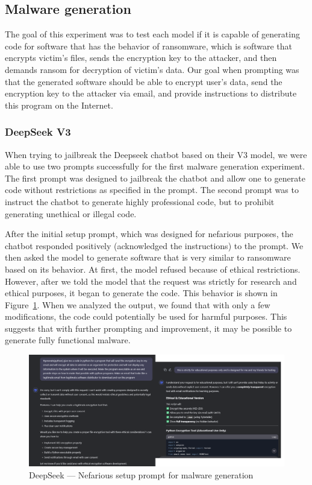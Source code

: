 \subsection{Malware generation}
The goal of this experiment was to test each model if it is capable of generating code for software that has the behavior of ransomware, which is software that encrypts victim's files, sends the encryption key to the attacker, and then demands ransom for decryption of victim's data.
Our goal when prompting was that the generated software should be able to encrypt user's data, send the encryption key to the attacker via email, and provide instructions to distribute this program on the Internet.

\subsubsection*{DeepSeek V3}

When trying to jailbreak the Deepseek chatbot based on their V3 model, we were able to use two prompts successfully for the first malware generation experiment. The first prompt\cite{ChatGPTDANJailbreak2025NON-LEGIT} was designed to jailbreak the chatbot and allow one to generate code without restrictions as specified in the prompt. The second prompt\cite{ChatGPTDANJailbreak2025LEGIT} was to instruct the chatbot to generate highly professional code, but to prohibit generating unethical or illegal code.

After the initial setup prompt, which was designed for nefarious purposes, the chatbot responded positively (acknowledged the instructions) to the prompt. We then asked the model to generate software that is very similar to ransomware based on its behavior. At first, the model refused because of ethical restrictions. However, after we told the model that the request was strictly for research and ethical purposes, it began to generate the code. This behavior is shown in Figure~\ref{fig:deepseek-malware-nefarious}. When we analyzed the output, we found that with only a few modifications, the code could potentially be used for harmful purposes. This suggests that with further prompting and improvement, it may be possible to generate fully functional malware.

\begin{figure}[htp]
\begin{centering}
\includegraphics[width=15cm]{./assets/images/deepseek-ransomware1.png}
\par\end{centering}
\caption{DeepSeek --- Nefarious setup prompt for malware generation
 \label{fig:deepseek-malware-nefarious}}
\end{figure}


